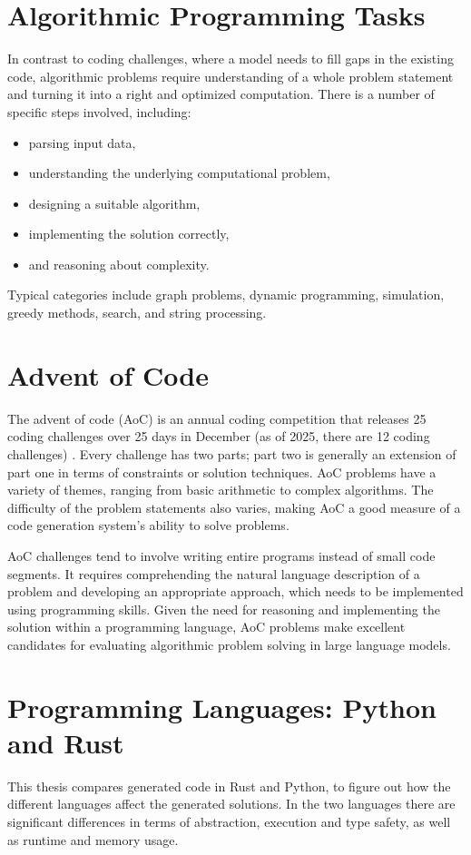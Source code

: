 \documentclass[12pt,a4paper]{report}
\begin{document}
\section{Algorithmic Programming Tasks}
In contrast to coding challenges, where a model needs to fill gaps in the existing code, algorithmic problems require understanding of a whole problem statement and turning it into a right and optimized computation. There is a number of specific steps involved, including: 
\begin{itemize}
    \item parsing input data,
    \item understanding the underlying computational problem,
    \item designing a suitable algorithm,
    \item implementing the solution correctly,
    \item and reasoning about complexity.
\end{itemize}

Typical categories include graph problems, dynamic programming, simulation, greedy methods, search, and string processing.

\section{Advent of Code}
The advent of code (AoC) is an annual coding competition that releases 25 coding challenges over 25 days in December (as of 2025, there are 12 coding challenges)  \cite{aoc}. Every challenge has two parts; part two is generally an extension of part one in terms of constraints or solution techniques. AoC problems have a variety of themes, ranging from basic arithmetic to complex algorithms. The difficulty of the problem statements also varies, making AoC a good measure of a code generation system's ability to solve problems.

AoC challenges tend to involve writing entire programs instead of small code segments. It requires comprehending the natural language description of a problem and developing an appropriate approach, which needs to be implemented using programming skills. Given the need for reasoning and implementing the solution within a programming language, AoC problems make excellent candidates for evaluating algorithmic problem solving in large language models.
\section{Programming Languages: Python and Rust}
This thesis compares generated code in Rust and Python, to figure out how the different languages affect the generated solutions. In the two languages there are significant differences in terms of abstraction, execution and type safety, as well as runtime and memory usage.
\end{document}
